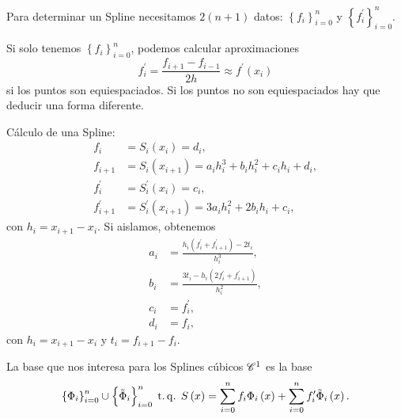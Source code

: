 Para determinar un Spline necesitamos $2(n+1)$ datos: $\left\{ f_i \right\}_{i=0}^n$ y $\left\{ f^{\prime}_i \right\}_{i=0}^n$.

\begin{obs}
    Si solo tenemos $\left\{ f_i \right\}_{i=0}^n$, podemos calcular aproximaciones
    \[
        f^{\prime}_i = \frac{f_{i+1}-f_{i-1}}{2h}\approx f^{\prime}\left( x_i \right)
    \]
    si los puntos son equiespaciados. Si los puntos no son equiespaciados hay que deducir una forma diferente.

    Cálculo de una Spline:
    \begin{align*}
        f_i &= S_i\left( x_i \right) = d_i, \\
        f_{i+1} &= S_i\left( x_{i+1} \right) = a_i h_i^3 + b_ih_i^2 + c_ih_i + d_i, \\
        f^{\prime}_i &= S^{\prime}_i\left( x_i \right) = c_i, \\
        f^{\prime}_{i+1} &= S^{\prime}_i\left( x_{i+1} \right) = 3a_ih_i^2 + 2b_ih_i + c_i,
    \end{align*}
    con $h_i = x_{i+1} - x_i$. Si aislamos, obtenemos
    \begin{align*}
        a_i &= \frac{h_i\left( f^{\prime}_i + f^{\prime}_{i+1} \right) - 2t_i}{h_i^3}, \\
        b_i &= \frac{3t_i - h_i\left( 2f^{\prime}_i + f^{\prime}_{i+1} \right)}{h_i^2}, \\
        c_i &= f^{\prime}_i, \\
        d_i &= f_i,
    \end{align*}
    con $h_i = x_{i+1} - x_i$ y $t_i = f_{i+1} - f_i$.
\end{obs}

La base que nos interesa para los Splines cúbicos $\mathscr{C}^1$ es la base 
\[
    \left\{ \Phi_i \right\}_{i=0}^n \cup \left\{ \tilde{\Phi}_i \right\}_{i=0}^n \operatorname{\;t.q.\;} S\left( x \right) = \sum_{i=0}^n f_i\Phi_i\left( x \right) + \sum_{i=0}^n f^{\prime}_i\tilde{\Phi}_i\left( x \right).
\]

